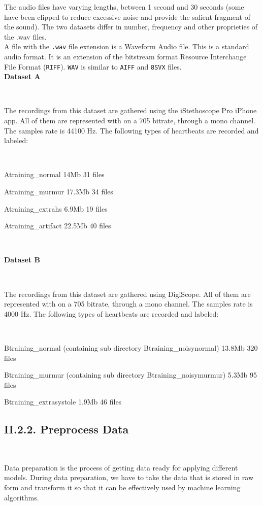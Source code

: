 \documentclass[11pt, a4papper]{report}
\theoremstyle{plain}
\theoremstyle{definition}
\theoremstyle{definition}
\theoremstyle{proposition}
\begin{document}
The audio files have varying lengths, between 1 second and 30 seconds (some have been clipped to reduce excessive noise and provide the salient fragment of the sound). The two datasets differ in number, frequency and other proprieties of the .wav files.
\\

A file with the \verb|.wav| file extension is a Waveform Audio file. This is a standard audio format. It is an extension of the bitstream format Resource Interchange File Format (\verb|RIFF|). \verb|WAV| is similar to \verb|AIFF| and \verb|8SVX| files.
\\

\textbf{Dataset A}

\

The recordings from this dataset are gathered using the iStethoscope Pro iPhone app. All of them are represented with on a 705  bitrate, through a mono channel. The samples rate is 44100 Hz. The following types of heartbeats are recorded and labeled:

\

Atraining\_normal 14Mb 31 files
\

Atraining\_murmur 17.3Mb 34 files
\

Atraining\_extrahs 6.9Mb 19 files
\

Atraining\_artifact 22.5Mb 40 files

\

\textbf{Dataset B}

\

The recordings from this dataset are gathered using DigiScope. All of them are represented with on a 705  bitrate, through a mono channel. The samples rate is 4000 Hz. The following types of heartbeats are recorded and labeled:

\

Btraining\_normal (containing sub directory Btraining\_noisynormal) 13.8Mb 320 files
\

Btraining\_murmur (containing sub directory Btraining\_noisymurmur) 5.3Mb 95 files
\

Btraining\_extrasystole 1.9Mb 46 files
\\


\subsection*{II.2.2. Preprocess Data}

\

Data preparation is the process of getting data ready for applying different models. During data preparation, we have to take the data that is stored in raw form and transform it so that it can be effectively used by machine learning algorithms. 
\\
\end{document}
